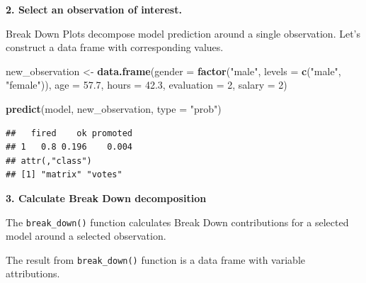\documentclass[]{krantz}
\newenvironment{Shaded}{\begin{snugshade}}{\end{snugshade}}
\newcommand{\ControlFlowTok}[1]{\textcolor[rgb]{0.13,0.29,0.53}{\textbf{#1}}}
\newcommand{\DataTypeTok}[1]{\textcolor[rgb]{0.13,0.29,0.53}{#1}}
\newcommand{\DecValTok}[1]{\textcolor[rgb]{0.00,0.00,0.81}{#1}}
\newcommand{\FloatTok}[1]{\textcolor[rgb]{0.00,0.00,0.81}{#1}}
\newcommand{\KeywordTok}[1]{\textcolor[rgb]{0.13,0.29,0.53}{\textbf{#1}}}
\newcommand{\NormalTok}[1]{#1}
\newcommand{\OperatorTok}[1]{\textcolor[rgb]{0.81,0.36,0.00}{\textbf{#1}}}
\newcommand{\StringTok}[1]{\textcolor[rgb]{0.31,0.60,0.02}{#1}}
\theoremstyle{definition}
\theoremstyle{definition}
\theoremstyle{definition}
\theoremstyle{remark}
\begin{document}
\begin{Shaded}
\end{Shaded}

\textbf{2. Select an observation of interest.}

Break Down Plots decompose model prediction around a single observation.
Let's construct a data frame with corresponding values.

\begin{Shaded}
\begin{Highlighting}[]
\NormalTok{new_observation <-}\StringTok{ }\KeywordTok{data.frame}\NormalTok{(}\DataTypeTok{gender =} \KeywordTok{factor}\NormalTok{(}\StringTok{"male"}\NormalTok{, }\DataTypeTok{levels =} \KeywordTok{c}\NormalTok{(}\StringTok{"male"}\NormalTok{, }\StringTok{"female"}\NormalTok{)),}
                      \DataTypeTok{age =} \FloatTok{57.7}\NormalTok{,}
                      \DataTypeTok{hours =} \FloatTok{42.3}\NormalTok{,}
                      \DataTypeTok{evaluation =} \DecValTok{2}\NormalTok{,}
                      \DataTypeTok{salary =} \DecValTok{2}\NormalTok{)}

\KeywordTok{predict}\NormalTok{(model, new_observation, }\DataTypeTok{type =} \StringTok{"prob"}\NormalTok{)}
\end{Highlighting}
\end{Shaded}

\begin{verbatim}
##   fired    ok promoted
## 1   0.8 0.196    0.004
## attr(,"class")
## [1] "matrix" "votes"
\end{verbatim}

\textbf{3. Calculate Break Down decomposition}

The \texttt{break\_down()} function calculates Break Down contributions
for a selected model around a selected observation.

The result from \texttt{break\_down()} function is a data frame with
variable attributions.
\end{document}
